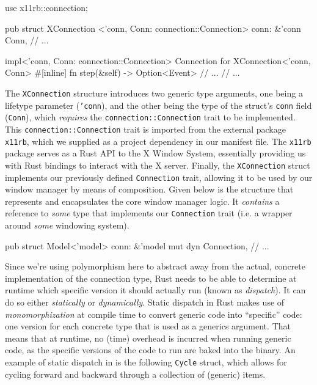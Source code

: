 \begin{rustblock}
  use x11rb::connection;
 
  pub struct XConnection
    <'conn, Conn: connection::Connection>
  {
    conn: &'conn Conn,
    // ...
  }
 
  impl<'conn, Conn: connection::Connection>
    Connection for XConnection<'conn, Conn>
  {
    #[inline]
    fn step(&self) -> Option<Event> {
      // ...
    }
    // ...
  }
\end{rustblock}

The  \texttt{XConnection}  structure  introduces  two  generic  type  arguments,
one  being   a  lifetype  parameter   (\texttt{'conn}),  and  the   other  being
the   type  of   the   struct's  \texttt{conn}   field  (\texttt{Conn}),   which
\textit{requires} the  \texttt{connection::Connection} trait to  be implemented.
This \texttt{connection::Connection} trait is imported from the external package
\texttt{x11rb}, which we supplied as a  project dependency in our manifest file.
The  \texttt{x11rb}  package serves  as  a  Rust API  to  the  X Window  System,
essentially  providing us  with Rust  bindings to  interact with  the X  server.
Finally,  the  \texttt{XConnection}  struct implements  our  previously  defined
\texttt{Connection} trait, allowing it to be used by our window manager by means
of composition.  Given below is  the structure that represents  and encapsulates
the core window manager logic. It \textit{contains} a reference to \textit{some}
type  that  implements our  \texttt{Connection}  trait  (i.e. a  wrapper  around
\textit{some} windowing system).

\begin{rustblock}
  pub struct Model<'model> {
    conn: &'model mut dyn Connection,
    // ...
  }
\end{rustblock}


Since  we're  using  polymorphism  here   to  abstract  away  from  the  actual,
concrete  implementation of  the  connection  type, Rust  needs  to  be able  to
determine  at runtime  which  specific  version it  should  actually run  (known
as  \textit{dispatch})\cite{therustbook, rustblogtraits}.  It can  do so  either
\textit{statically} or  \textit{dynamically}. Static dispatch in  Rust makes use
of  \textit{monomorphization}  at compile  time  to  convert generic  code  into
``specific'' code: one version for each concrete type that is used as a generics
argument\cite{therustbook,  rustblogtraits}.  That  means that  at  runtime,  no
(time) overhead is incurred when running  generic code, as the specific versions
of the code to run  are baked into the binary\cite{therustbook, rustblogtraits}.
An example of  static dispatch in \wmrs is the  following \texttt{Cycle} struct,
which allows for cycling forward and  backward through a collection of (generic)
items.

